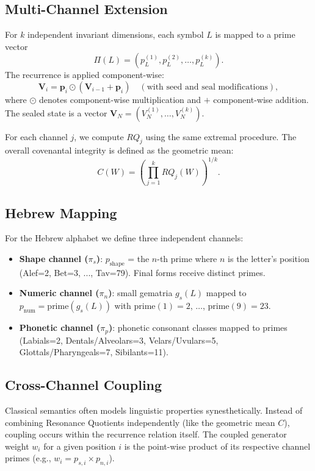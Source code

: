 \documentclass[12pt, a4paper]{article}
\begin{document}
\subsection{Multi-Channel Extension}

For $k$ independent invariant dimensions, each symbol $L$ is mapped to a prime vector
\[
\Pi(L) = (p^{(1)}_L, p^{(2)}_L, \dots, p^{(k)}_L).
\]
The recurrence is applied component-wise:
\[
\mathbf{V}_i = \mathbf{p}_i \odot (\mathbf{V}_{i-1} + \mathbf{p}_i) \quad (\text{with seed and seal modifications}),
\]
where $\odot$ denotes component-wise multiplication and $+$ component-wise addition. The sealed state is a vector $\mathbf{V}_N = (V_N^{(1)}, \dots, V_N^{(k)})$.

For each channel $j$, we compute $RQ_j$ using the same extremal procedure. The overall covenantal integrity is defined as the geometric mean:
\[
C(W) = \left(\prod_{j=1}^k RQ_j(W)\right)^{1/k}.
\]

\subsection{Hebrew Mapping}

For the Hebrew alphabet we define three independent channels:

\begin{itemize}
\item \textbf{Shape channel ($\pi_s$)}: $p_{\text{shape}}$ = the $n$-th prime where $n$ is the letter's position (Alef=2, Bet=3, ..., Tav=79). Final forms receive distinct primes.
\item \textbf{Numeric channel ($\pi_n$)}: small gematria $g_s(L)$ mapped to $p_{\text{num}} = \text{prime}(g_s(L))$ with $\text{prime}(1)=2$, $\dots$, $\text{prime}(9)=23$.
\item \textbf{Phonetic channel ($\pi_p$)}: phonetic consonant classes mapped to primes (Labials=2, Dentals/Alveolars=3, Velars/Uvulars=5, Glottals/Pharyngeals=7, Sibilants=11).
\end{itemize}

\subsection{Cross-Channel Coupling}

Classical semantics often models linguistic properties synesthetically. Instead of combining Resonance Quotients independently (like the geometric mean $C$), coupling occurs within the recurrence relation itself. The coupled generator weight $w_i$ for a given position $i$ is the point-wise product of its respective channel primes (e.g., $w_i = p_{s,i} \times p_{n,i}$). 
\end{document}
